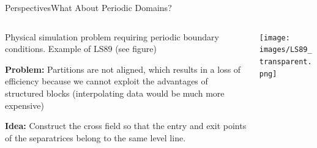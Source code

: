 \documentclass[compress,10pt,aspectratio=169]{beamer}
\begin{document}
\begin{frame}{Perspectives}{What About Periodic Domains?}
\small
\begin{columns}
    \begin{column}{0.55\textwidth}
Physical simulation problem requiring periodic boundary conditions. Example of LS89 (see figure)\\\vspace{0.3cm}

\textbf{Problem:} Partitions are not aligned, which results in a loss of efficiency because we cannot exploit the advantages of structured blocks (interpolating data would be much more expensive)\\\vspace{0.3cm}

\textbf{Idea:} Construct the cross field so that the entry and exit points of the separatrices belong to the same level line.

    \end{column}
    \begin{column}{0.45\textwidth}
    \vspace{-0.5cm}
        \centering
\texttt{[image: images/LS89\_transparent.png]}
    \end{column}
\end{columns}
\end{frame}







\end{document}
